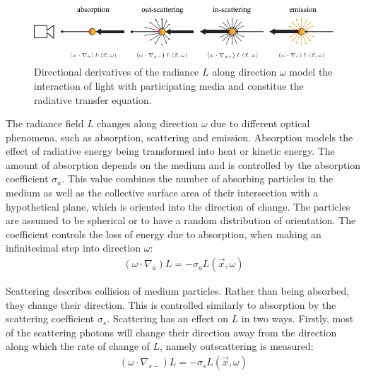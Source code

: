 \begin{figure}[h]
\centering
\includegraphics[width=1.0\textwidth]{03_foundations_of_light_transport_simulation/figures/fig_rte_terms.pdf}
\caption{Directional derivatives of the radiance $L$ along direction $\omega$ model the interaction of light with participating media and constitue the radiative transfer equation.}
\label{fig:rte_change_L_all}
\end{figure}

The radiance field $L$ changes along direction $\omega$ due to different optical phenomena, such as absorption, scattering and emission. Absorption models the effect of radiative energy being transformed into heat or kinetic energy. The amount of absorption depends on the medium and is controlled by the absorption coefficient $\sigma_a$. This value combines the number of absorbing particles in the medium as well as the collective surface area of their intersection with a hypothetical plane, which is oriented into the direction of change. The particles are assumed to be spherical or to have a random distribution of orientation. The coefficient controls the loss of energy due to absorption, when making an infinitesimal step into direction $\omega$:
\begin{align}
\left(\omega\cdot\nabla_{a}\right)L = -\sigma_a L\left(\vec{x}, \omega \right)
\end{align}

Scattering describes collision of medium particles. Rather than being absorbed, they change their direction. This is controlled similarly to absorption by the scattering coefficient $\sigma_s$. Scattering has an effect on $L$ in two ways. Firstly, most of the scattering photons will change their direction away from the direction along which the rate of change of $L$, namely outscattering is measured:
\begin{align}
\left(\omega\cdot\nabla_{s-}\right)L = -\sigma_s L\left(\vec{x}, \omega \right)
\end{align}

